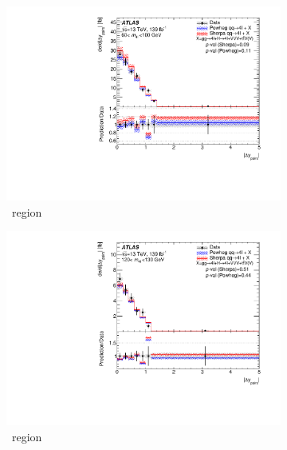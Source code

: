 \begin{figure}[htb!]
    \begin{subfigure}{.49\textwidth}\centering
      \includegraphics[width=.99\linewidth]{Figures/m4l/UnfoldedResults/linY_Unfolded_Data_deltaYPairs_m4l60-100.pdf}\caption{\ZFourL \ region}\label{fig:sub-first}
    \end{subfigure}
    \begin{subfigure}{.49\textwidth}\centering
      \includegraphics[width=.99\linewidth]{Figures/m4l/UnfoldedResults/linY_Unfolded_Data_deltaYPairs_m4l120-130.pdf} \caption{\HFourL \ region}\label{fig:sub-second}
    \end{subfigure}
    \begin{subfigure}{.49\textwidth}\centering

\end{subfigure}
\end{figure}
